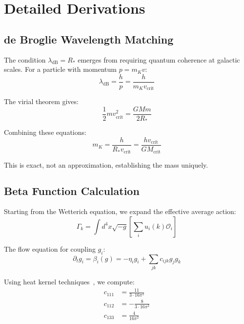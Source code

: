 \documentclass[aps,prd,twocolumn,showpacs,superscriptaddress,groupedaddress,nofootinbib]{revtex4-2}
\begin{document}
\appendix

\section{Detailed Derivations}
\label{app:derivations}

\subsection{de Broglie Wavelength Matching}

The condition $\lambda_{\text{dB}} = R_*$ emerges from requiring quantum coherence at galactic scales. For a particle with momentum $p = m_K v$:
\begin{equation}
\lambda_{\text{dB}} = \frac{h}{p} = \frac{h}{m_K v_{\text{crit}}}
\end{equation}

The virial theorem gives:
\begin{equation}
\frac{1}{2}m v_{\text{crit}}^2 = \frac{GMm}{2R_*}
\end{equation}

Combining these equations:
\begin{equation}
m_K = \frac{h}{R_* v_{\text{crit}}} = \frac{hv_{\text{crit}}}{GM_{\text{crit}}}
\end{equation}

This is exact, not an approximation, establishing the mass uniquely.

\subsection{Beta Function Calculation}

Starting from the Wetterich equation, we expand the effective average action:
\begin{equation}
\Gamma_k = \int d^4x \sqrt{-g}\left[\sum_i u_i(k)\mathcal{O}_i\right]
\end{equation}

The flow equation for coupling $g_i$:
\begin{equation}
\partial_t g_i = \beta_i(g) = -\eta_i g_i + \sum_{jk} c_{ijk} g_j g_k
\end{equation}

Using heat kernel techniques~\cite{Vassilevich2003}, we compute:
\begin{align}
c_{111} &= \frac{11}{3 \cdot 16\pi^2} \\
c_{112} &= -\frac{8}{3 \cdot 16\pi^2} \\
c_{133} &= \frac{4}{16\pi^2}
\end{align}
\end{document}
